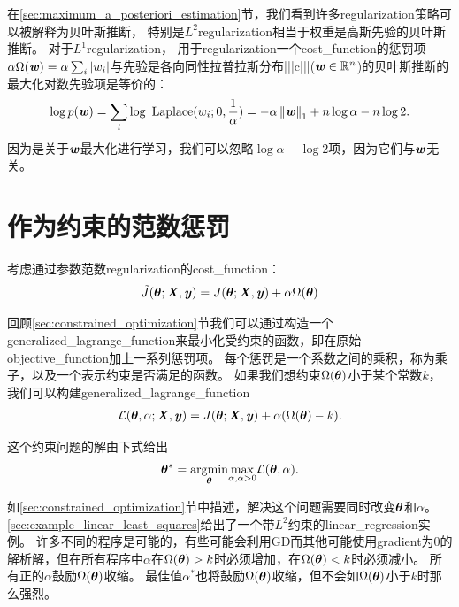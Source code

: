 在\ref{sec:maximum_a_posteriori_estimation}节，我们看到许多\gls{regularization}策略可以被解释为贝叶斯推断，
 特别是$L^2$\gls{regularization}相当于权重是高斯先验的贝叶斯推断。
 对于$L^1$\gls{regularization}，
用于\gls{regularization}一个\gls{cost_function}的惩罚项$\alpha \Omega(\boldsymbol{\mathit{w}}) =  \alpha \sum_i |w_i |$与先验是各向同性拉普拉斯分布|||c|||($\boldsymbol{\mathit{w}} \in \mathbb{R}^n$)的贝叶斯推断的最大化对数先验项是等价的：
\begin{align}
\log p(\boldsymbol{\mathit{w}}) = \sum_i \log ~\text{Laplace}(w_i;0,\frac{1}{\alpha}) = 
  -\alpha \left\lVert\boldsymbol{\mathit{w}}\right\rVert_1 + n \log \alpha - n \log 2.
\end{align}
因为是关于$\boldsymbol{\mathit{w}}$最大化进行学习，我们可以忽略$\log \alpha - \log 2$项，因为它们与$\boldsymbol{\mathit{w}}$无关。
 
 
 \section{作为约束的范数惩罚}
 \label{sec:7.2}
考虑通过参数范数\gls{regularization}的\gls{cost_function}：
\begin{align}
 \tilde{J}(\boldsymbol{\theta};\boldsymbol{\mathit{X}}, \boldsymbol{\mathit{y}}) = J(\boldsymbol{\theta};\boldsymbol{\mathit{X}}, \boldsymbol{\mathit{y}}) + \alpha \Omega(\boldsymbol{\theta})
\end{align}

回顾\ref{sec:constrained_optimization}节我们可以通过构造一个\gls{generalized_lagrange_function}来最小化受约束的函数，即在原始\gls{objective_function}加上一系列惩罚项。
每个惩罚是一个系数之间的乘积，称为乘子，以及一个表示约束是否满足的函数。
如果我们想约束$\Omega(\boldsymbol{\theta})$小于某个常数$k$，我们可以构建\gls{generalized_lagrange_function}
\begin{align}
 \mathcal{L}(\boldsymbol{\theta}, \alpha; \boldsymbol{\mathit{X}}, \boldsymbol{\mathit{y}}) = J(\boldsymbol{\theta}; \boldsymbol{\mathit{X}}, \boldsymbol{\mathit{y}}) + \alpha (\Omega(\boldsymbol{\theta}) - k).
\end{align}

这个约束问题的解由下式给出
\begin{align}
 \boldsymbol{\theta}^* = \underset{\boldsymbol{\theta}}{ \arg\!\min} \underset{\alpha, \alpha>0}{\max} \mathcal{L}(\boldsymbol{\theta}, \alpha).
\end{align}

如\ref{sec:constrained_optimization}节中描述，解决这个问题需要同时改变$\boldsymbol{\theta}$和$\alpha$。
\ref{sec:example_linear_least_squares}给出了一个带$L^2$约束的\gls{linear_regression}实例。
许多不同的程序是可能的，有些可能会利用\gls{GD}而其他可能使用\gls{gradient}为0的解析解，但在所有程序中$\alpha$在$\Omega(\boldsymbol{\theta}) > k$时必须增加，在$\Omega(\boldsymbol{\theta}) < k$时必须减小。
所有正的$\alpha$鼓励$\Omega(\boldsymbol{\theta})$收缩。
最佳值$\alpha^*$也将鼓励$\Omega(\boldsymbol{\theta})$收缩，但不会如$\Omega(\boldsymbol{\theta})$小于$k$时那么强烈。

